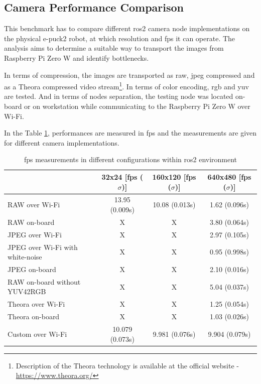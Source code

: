 \subsection{Camera Performance Comparison}
This benchmark has to compare different \ac{ros2} camera node implementations on the physical e-puck2 robot, at which resolution and \ac{fps} it can operate.
The analysis aims to determine a suitable way to transport the images from Raspberry Pi Zero W and identify bottlenecks.

In terms of compression, the images are transported as raw, \ac{jpeg} compressed and as a Theora compressed video stream\footnote{Description of the Theora technology is available at the official website - \url{https://www.theora.org/}}.
In terms of color encoding, \ac{rgb} and \acs{yuv} are tested.
And in terms of nodes separation, the testing node was located on-board or on workstation while communicating to the Raspberry Pi Zero W over Wi-Fi.

In the Table \ref{tab:results:camera_perf}, performances are measured in \ac{fps} and the measurements are given for different camera implementations.

\begin{table}[H]
    \begin{adjustwidth}{-1.5in}{-1.5in} 
    \centering
    \begin{tabular}{|l|c|c|c|}
        \hline
         & 32x24 [\ac{fps} ($ \sigma $)] & 160x120 [\ac{fps} ($ \sigma $)] & 640x480 [\ac{fps} ($ \sigma $)] \\
         \hline
         RAW over Wi-Fi & 13.95 (0.009s) & 10.08 (0.013s) & 1.62 (0.096s) \\
         \hline
         RAW on-board & X & X & 3.80 (0.064s) \\
        \hline
        JPEG over Wi-Fi & X & X & 2.97 (0.105s) \\
        \hline
        JPEG over Wi-Fi with white-noise & X & X & 0.95 (0.998s) \\
        \hline
        JPEG on-board & X & X & 2.10 (0.016s) \\
        \hline
        RAW on-board without YUV42RGB & X & X & 5.04 (0.037s) \\
        \hline
        Theora over Wi-Fi & X & X & 1.25 (0.054s) \\
        \hline
        Theora on-board & X & X & 1.03 (0.026s) \\
        \hline
        Custom over Wi-Fi & 10.079 (0.073s) & 9.981 (0.076s) & 9.904 (0.079s) \\
        \hline
    \end{tabular}
    \end{adjustwidth}
    
    \caption{\ac{fps} measurements in different configurations within \ac{ros2} environment}
    \label{tab:results:camera_perf}
\end{table}

